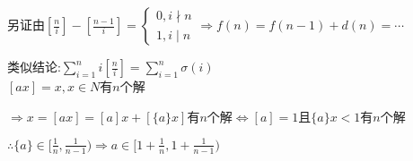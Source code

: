 另证由$ [\frac{n}{i}]-[\frac{n-1}{i}]=\left \{ \begin{matrix} 0,i\nmid n\\ 1,i \mid n \end{matrix}\right.\Rightarrow f(n)=f(n-1)+d(n)=\cdots$

类似结论:$ \sum_{i=1}^{n}{i[\frac{n}{i}]}=\sum_{i=1}^{n}{\sigma(i)}$
\\

$ [ax]=x,x\in N$有$ n$个解

$ \Rightarrow x=[ax]=[a]x+[\{ a\}x]$有$ n$个解$ \Leftrightarrow [a]=1$且$ \{ a\}x<1$有$ n$个解

$ \therefore \{ a\}\in [\frac{1}{n},\frac{1}{n-1})\Rightarrow a \in [1+\frac{1}{n},1+\frac{1}{n-1})$
\\


